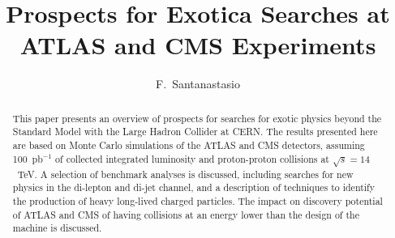 \documentclass{cimento}
\title{Prospects for Exotica Searches at ATLAS and CMS Experiments}
\author{F.~Santanastasio\from{ins:UMD}\ETC
}
\begin{document}
%
\maketitle
%
\begin{abstract}
    This paper presents an overview of prospects for searches for exotic physics 
    beyond the Standard Model with the Large Hadron Collider at CERN. 
    The results presented here are based on Monte Carlo simulations of the
    ATLAS and CMS detectors, assuming 100~pb$^{-1}$ of collected integrated 
    luminosity and proton-proton collisions 
    at $\sqrt{s} = 14$~TeV. A selection of benchmark analyses is discussed, 
    including searches for new physics in the di-lepton and di-jet channel, 
    and a description of techniques to identify the production of 
    heavy long-lived charged particles. 
    The impact on discovery potential of ATLAS and CMS  
    of having collisions at an energy lower than the design of the machine 
    is discussed.
\end{abstract}
%
\end{document}
